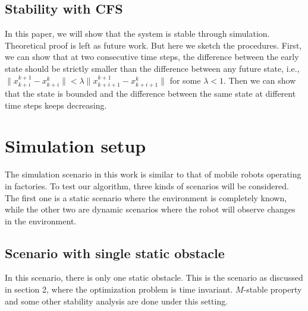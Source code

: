 \documentclass{ifacconf}
\begin{document}
\subsection{Stability with CFS}
In this paper, we will show that the system is stable through simulation. Theoretical proof is left as future work. But here we sketch the procedures. First, we can show that at two consecutive time steps, the difference between the early state should be strictly smaller than the difference between any future state, i.e., $\|x_{k+i}^{k+1}-x_{k+i}^k\|<\lambda\|x_{k+i+1}^{k+1}-x_{k+i+1}^k\|$ for some $\lambda<1$. Then we can show that the state is bounded and the difference between the same state at different time steps keeps decreasing.
%
%

\section{Simulation setup}

The simulation scenario in this work is similar to that of mobile robots operating in factories. To test our algorithm, three kinds of scenarios will be considered. The first one is a static scenario where the environment  is completely known, while the other two are dynamic scenarios where the robot will observe changes in the environment.

\subsection{Scenario with single static obstacle}
In this scenario, there is  only one static obstacle. This is the scenario as discussed in section 2, where the optimization problem is time invariant. $M$-stable property and some other stability analysis are done under this setting.
\end{document}
